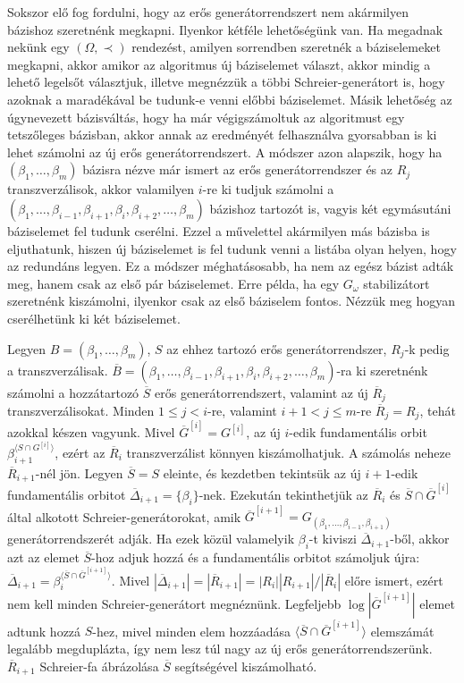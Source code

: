 Sokszor elő fog fordulni, hogy az erős generátorrendszert nem akármilyen bázishoz szeretnénk megkapni.
Ilyenkor kétféle lehetőségünk van.
Ha megadnak nekünk egy $(\Omega, \prec)$ rendezést, amilyen sorrendben szeretnék a báziselemeket megkapni, akkor amikor az algoritmus új báziselemet választ, akkor mindig a lehető legelsőt választjuk,
illetve megnézzük a többi Schreier-generátort is, hogy azoknak a maradékával be tudunk-e venni előbbi báziselemet.
Másik lehetőség az úgynevezett bázisváltás, hogy ha már végigszámoltuk az algoritmust egy tetszőleges bázisban, akkor annak az eredményét felhasználva gyorsabban is ki lehet számolni az új erős generátorrendszert.
A módszer azon alapszik, hogy ha $(\beta_1, \dots, \beta_m)$ bázisra nézve már ismert az erős generátorrendszer és az $R_j$ transzverzálisok, akkor valamilyen $i$-re ki tudjuk számolni a $(\beta_1, \dots, \beta_{i-1}, \beta_{i+1}, \beta_i, \beta_{i+2}, \dots, \beta_m)$
bázishoz tartozót is, vagyis két egymásutáni báziselemet fel tudunk cserélni.
Ezzel a művelettel akármilyen más bázisba is eljuthatunk, hiszen új báziselemet is fel tudunk venni a listába olyan helyen, hogy az redundáns legyen.
Ez a módszer méghatásosabb, ha nem az egész bázist adták meg, hanem csak az első pár báziselemet.
Erre példa, ha egy $G_{\omega}$ stabilizátort szeretnénk kiszámolni, ilyenkor csak az első báziselem fontos.
Nézzük meg hogyan cserélhetünk ki két báziselemet.

Legyen $B = (\beta_1, \dots, \beta_m)$, $S$ az ehhez tartozó erős generátorrendszer, $R_j$-k pedig a transzverzálisak.
$\overline{B} = (\beta_1, \dots, \beta_{i-1}, \beta_{i+1}, \beta_i, \beta_{i+2}, \dots, \beta_m)$-ra ki szeretnénk számolni a hozzátartozó $\overline{S}$ erős generátorrendszert, valamint az új $\overline{R}_j$ transzverzálisokat.
Minden $1 \le j < i$-re, valamint $i+1 < j \le m$-re $\overline{R}_j = R_j$, tehát azokkal készen vagyunk.
Mivel $\overline{G}^{[i]} = G^{[i]}$, az új $i$-edik fundamentális orbit $\beta_{i+1}^{\langle S \cap G^{[i]} \rangle}$, ezért az $\overline{R}_i$ transzverzálist könnyen kiszámolhatjuk.
A számolás neheze $\overline{R}_{i+1}$-nél jön.
Legyen $\overline{S} = S$ eleinte, és kezdetben tekintsük az új $i+1$-edik fundamentális orbitot $\overline{\Delta}_{i+1} = \{\beta_i\}$-nek.
Ezekután tekinthetjük az $\overline{R}_i$ és $\overline{S}\cap \overline{G}^{[i]}$ által alkotott Schreier-generátorokat, amik $\overline{G}^{[i+1]} = G_{(\beta_1,\dots,\beta_{i-1},\beta_{i+1})}$ generátorrendszerét adják.
Ha ezek közül valamelyik $\beta_i$-t kiviszi $\overline{\Delta}_{i+1}$-ből, akkor azt az elemet $\overline{S}$-hoz adjuk hozzá és a fundamentális orbitot számoljuk újra:
$\overline{\Delta}_{i+1} = \beta_i^{\langle \overline{S} \cap \overline{G}^{[i+1]} \rangle}$.
Mivel $|\overline{\Delta}_{i+1}| = |\overline{R}_{i+1}| = |R_i| |R_{i+1}| / |\overline{R}_i|$ előre ismert, ezért nem kell minden Schreier-generátort megnéznünk.
Legfeljebb $\log |\overline{G}^{[i+1]}|$ elemet adtunk hozzá $S$-hez, mivel minden elem hozzáadása $\langle \overline{S} \cap \overline{G}^{[i+1]} \rangle$ elemszámát legalább megduplázta, így nem lesz túl nagy az új erős generátorrendszerünk.
$\overline{R}_{i+1}$ Schreier-fa ábrázolása $\overline{S}$ segítségével kiszámolható.

